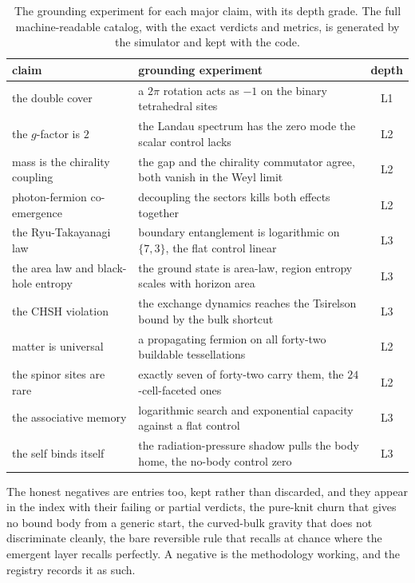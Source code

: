 \begin{table}[ht]
\centering
\small
\begin{tabular}{@{}lp{}c@{}}
\toprule
claim & grounding experiment & depth \\
\midrule
the double cover & a $2\pi$ rotation acts as $-1$ on the binary tetrahedral sites & L1 \\
the $g$-factor is $2$ & the Landau spectrum has the zero mode the scalar control lacks & L2 \\
mass is the chirality coupling & the gap and the chirality commutator agree, both vanish in the Weyl limit & L2 \\
photon-fermion co-emergence & decoupling the sectors kills both effects together & L2 \\
the Ryu-Takayanagi law & boundary entanglement is logarithmic on $\{7,3\}$, the flat control linear & L3 \\
the area law and black-hole entropy & the ground state is area-law, region entropy scales with horizon area & L3 \\
the CHSH violation & the exchange dynamics reaches the Tsirelson bound by the bulk shortcut & L3 \\
matter is universal & a propagating fermion on all forty-two buildable tessellations & L2 \\
the spinor sites are rare & exactly seven of forty-two carry them, the $24$-cell-faceted ones & L2 \\
the associative memory & logarithmic search and exponential capacity against a flat control & L3 \\
the self binds itself & the radiation-pressure shadow pulls the body home, the no-body control zero & L3 \\
\bottomrule
\end{tabular}
\caption{The grounding experiment for each major claim, with its depth grade. The full machine-readable catalog, with the exact verdicts and metrics, is generated by the simulator and kept with the code.}
\label{tab:expindex}
\end{table}

The honest negatives are entries too, kept rather than discarded, and they appear in the index with their failing or partial verdicts, the pure-knit churn that gives no bound body from a generic start, the curved-bulk gravity that does not discriminate cleanly, the bare reversible rule that recalls at chance where the emergent layer recalls perfectly. A negative is the methodology working, and the registry records it as such.
